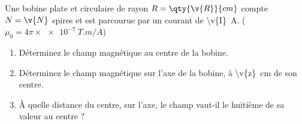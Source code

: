 Une bobine plate et circulaire de rayon $R = \qty{\v{R}}{cm}$ compte $N = \v{N}$ spires et est parcourue par un courant de \qty{\v{I}}{A}. ($\mu_0 = 4\pi \times \qty{e-7}{T.m/A}$)

\begin{enumerate}[label=\alph*)]
    \item Déterminez le champ magnétique au centre de la bobine.
    \item Déterminez le champ magnétique sur l'axe de la bobine, à \qty{\v{z}}{cm} de son centre.
    \item À quelle distance du centre, sur l'axe, le champ vaut-il le huitième de sa valeur au centre ?
\end{enumerate}
